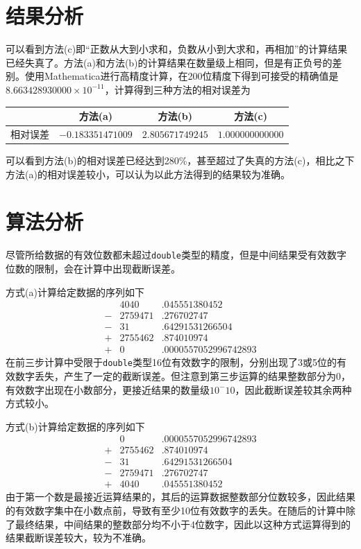 \documentclass[11pt]{article}
\begin{document}
\section{结果分析}
可以看到方法(c)即“正数从大到小求和，负数从小到大求和，再相加”的计算结果已经失真了。方法(a)和方法(b)的计算结果在数量级上相同，但是有正负号的差别。使用Mathematica进行高精度计算，在200位精度下得到可接受的精确值是$8.663428930000\times 10 ^ {-11}$，计算得到三种方法的相对误差为
\begin{table}[h]
    \centering
    \begin{tabular}{|c|c|c|c|}
        \hline
                 & 方法(a)           & 方法(b)          & 方法(c)          \\ \hline
        相对误差 & $-0.183351471009$ & $2.805671749245$ & $1.000000000000$ \\ \hline
    \end{tabular}
\end{table}
可以看到方法(b)的相对误差已经达到280\%，甚至超过了失真的方法(c)，相比之下方法(a)的相对误差较小，可以认为以此方法得到的结果较为准确。

\section{算法分析}
尽管所给数据的有效位数都未超过\texttt{double}类型的精度，但是中间结果受有效数字位数的限制，会在计算中出现截断误差。

方式(a)计算给定数据的序列如下
\begin{align*}
     &   & 4040    & .045551380452        & \\
     & - & 2759471 & .276702747           & \\
     & - & 31      & .64291531266504      & \\
     & + & 2755462 & .874010974           & \\
     & + & 0       & .0000557052996742893 &
\end{align*}
在前三步计算中受限于\texttt{double}类型16位有效数字的限制，分别出现了3或5位的有效数字丢失，产生了一定的截断误差。但注意到第三步运算的结果整数部分为0，有效数字出现在小数部分，更接近结果的数量级$10^-10$，因此截断误差较其余两种方式较小。

方式(b)计算给定数据的序列如下
\begin{align*}
     &   & 0       & .0000557052996742893 & \\
     & + & 2755462 & .874010974           & \\
     & - & 31      & .64291531266504      & \\
     & - & 2759471 & .276702747           & \\
     & + & 4040    & .045551380452        &
\end{align*}
由于第一个数是最接近运算结果的，其后的运算数据整数部分位数较多，因此结果的有效数字集中在小数点前，导致有至少10位有效数字的丢失。在随后的计算中除了最终结果，中间结果的整数部分均不小于4位数字，因此以这种方式运算得到的结果截断误差较大，较为不准确。
\end{document}
